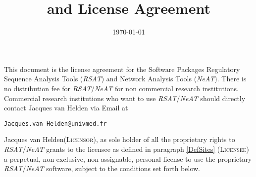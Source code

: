 \documentclass[12pt]{article}
\title{\RSAT and \NeAT License Agreement}
\author{\vspace*{-1cm}}
\date{\vspace*{-1cm}\today}
\makeatletter
\newcommand{\RSAT}[0]{\emph{RSAT}\xspace}
\newcommand{\NeAT}[0]{\emph{NeAT}\xspace}
\newcommand{\Licensorname}[0]{Jacques van Helden\xspace}
\newcommand{\Licensor}[0]{\textsc{Licensor}\xspace}
\newcommand{\Licensee}[0]{\textsc{Licensee}\xspace}
\newcommand{\JvHemail}[0]{\texttt{\small Jacques.van-Helden@univmed.fr}\xspace}
\makeatother
\begin{document}
\maketitle

This document is the license agreement for the Software Packages
Regulatory Sequence Analysis Tools (\RSAT) and Network Analysis Tools
(\NeAT).  There is no distribution fee for \RSAT/\NeAT for non
commercial research institutions. Commercial research institutions who
want to use \RSAT/\NeAT should directly contact Jacques van Helden via
Email at
\begin{center}
  \JvHemail
\end{center}

\Licensorname (\Licensor), as sole holder of all the proprietary
rights to \RSAT/\NeAT grants to the licensee as defined in paragraph
\ref{DefSites} (\Licensee) a perpetual, non-exclusive, non-assignable,
personal license to use the proprietary \RSAT/\NeAT software, subject
to the conditions set forth below.
\end{document}
